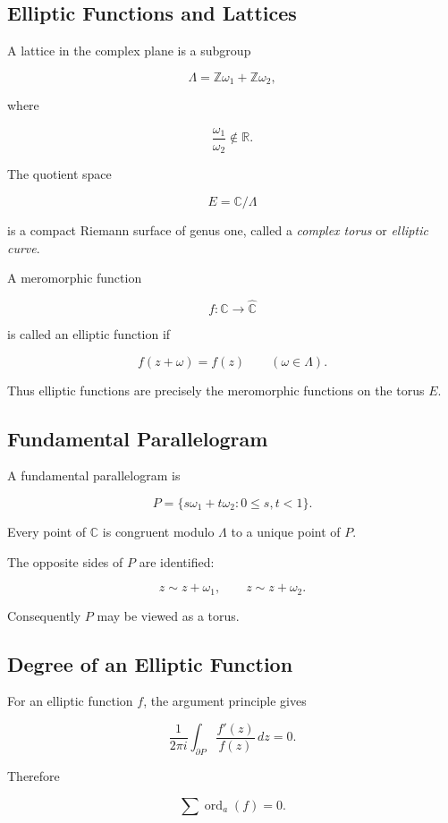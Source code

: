 \documentclass[12pt,a4paper]{article}
\theoremstyle{notespace}
\begin{document}
\subsection{Elliptic Functions and Lattices}

A lattice in the complex plane is a subgroup

\[
\Lambda
=
\mathbb Z\omega_1+\mathbb Z\omega_2,
\]

where

\[
\frac{\omega_1}{\omega_2}
\notin
\mathbb R.
\]

The quotient space

\[
E=\mathbb C/\Lambda
\]

is a compact Riemann surface of genus one, called a
\emph{complex torus} or \emph{elliptic curve}.

A meromorphic function

\[
f:\mathbb C\to\widehat{\mathbb C}
\]

is called an elliptic function if

\[
f(z+\omega)=f(z)
\qquad
(\omega\in\Lambda).
\]

Thus elliptic functions are precisely the meromorphic functions on the torus \(E\).

\subsection{Fundamental Parallelogram}

A fundamental parallelogram is

\[
P=
\{
s\omega_1+t\omega_2:
0\le s,t<1
\}.
\]

Every point of \(\mathbb C\) is congruent modulo \(\Lambda\) to a unique point of \(P\).

The opposite sides of \(P\) are identified:

\[
z
\sim
z+\omega_1,
\qquad
z
\sim
z+\omega_2.
\]

Consequently \(P\) may be viewed as a torus.

\subsection{Degree of an Elliptic Function}

For an elliptic function \(f\), the argument principle gives

\[
\frac{1}{2\pi i}
\int_{\partial P}
\frac{f'(z)}{f(z)}\,dz
=
0.
\]

Therefore

\[
\sum \operatorname{ord}_a(f)
=
0.
\]
\end{document}
